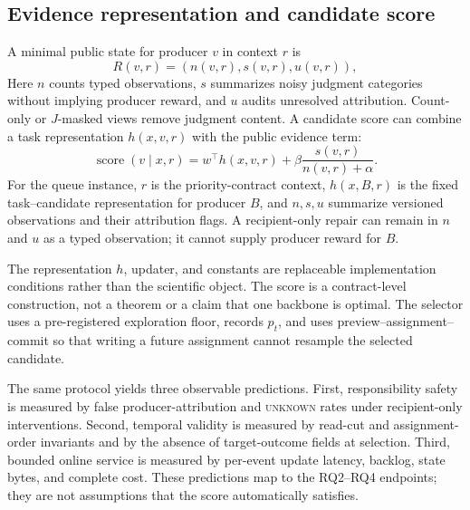 \documentclass[sigconf,anonymous]{aamas}
\newcommand{\unknown}{\textsc{unknown}}
\begin{document}
\subsection{Evidence representation and candidate score}
A minimal public state for producer $v$ in context $r$ is
\begin{equation}
 R(v,r)=(n(v,r),s(v,r),u(v,r)),
 \label{eq:state}
\end{equation}
Here $n$ counts typed observations, $s$ summarizes noisy judgment categories without implying producer reward, and $u$ audits unresolved attribution. Count-only or $J$-masked views remove judgment content. A candidate score can combine a task representation $h(x,v,r)$ with the public evidence term:
\begin{equation}
 \operatorname{score}(v\mid x,r)=w^\top h(x,v,r)+\beta\frac{s(v,r)}{n(v,r)+\alpha}.
 \label{eq:score}
\end{equation}
For the queue instance, $r$ is the priority-contract context, $h(x,B,r)$ is the fixed task--candidate representation for producer $B$, and $n,s,u$ summarize versioned observations and their attribution flags. A recipient-only repair can remain in $n$ and $u$ as a typed observation; it cannot supply producer reward for $B$.

The representation $h$, updater, and constants are replaceable implementation conditions rather than the scientific object. The score is a contract-level construction, not a theorem or a claim that one backbone is optimal. The selector uses a pre-registered exploration floor, records $p_t$, and uses preview--assignment--commit so that writing a future assignment cannot resample the selected candidate.

The same protocol yields three observable predictions. First, responsibility safety is measured by false producer-attribution and \unknown{} rates under recipient-only interventions. Second, temporal validity is measured by read-cut and assignment-order invariants and by the absence of target-outcome fields at selection. Third, bounded online service is measured by per-event update latency, backlog, state bytes, and complete cost. These predictions map to the RQ2--RQ4 endpoints; they are not assumptions that the score automatically satisfies.
\end{document}
